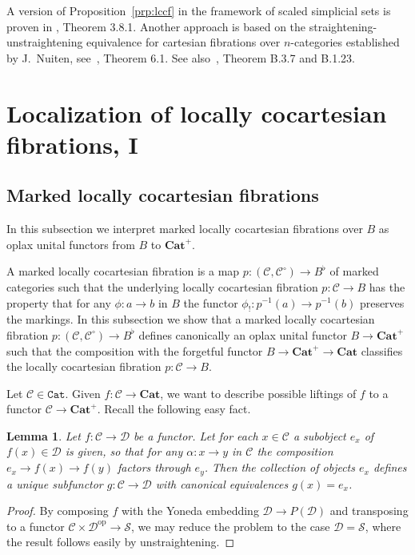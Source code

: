 \documentclass[12pt]{amsart}%
\newtheorem{lem}[subsubsection]{Lemma}
\newcommand{\Cat}{\mathtt{Cat}}
\newcommand{\bfCat}{\mathbf{Cat}}
\newcommand{\op}{\mathrm{op}}
\newcommand{\cC}{\mathcal{C}}
\newcommand{\cD}{\mathcal{D}}
\newcommand{\cS}{\mathcal{S}}
\begin{document}
A version of Proposition~\ref{prp:lccf} in the framework of scaled simplicial sets is proven in \cite{LG}, Theorem 3.8.1. Another approach is
based on the straightening-unstraightening equivalence for
cartesian fibrations over $n$-categories established by J.~Nuiten, see~\cite{N}, Theorem 6.1.
See also~\cite{AMGR}, Theorem B.3.7 and B.1.23.



\section{Localization of locally cocartesian fibrations, I}

\subsection{Marked locally cocartesian fibrations}
In this subsection we interpret marked locally cocartesian fibrations
over $B$ as oplax unital functors from $B$ to $\bfCat^+$.

A marked locally cocartesian fibration is a map $p:(\cC,\cC^\circ)\to B^\flat$
of marked categories such that the underlying locally cocartesian
fibration $p:\cC\to B$ has the property that
for any $\phi:a\to b$ in $B$ the functor $\phi_!:p^{-1}(a)\to p^{-1}(b)$ 
preserves the markings. 
In this subsection we show that a marked locally cocartesian fibration
$p:(\cC,\cC^\circ)\to B^\flat$
defines canonically an oplax unital functor 
$B\to\bfCat^+$ such that the composition with the forgetful functor 
$B\to\bfCat^+\to\bfCat$ classifies the locally cocartesian fibration
$p:\cC\to B$.
 

Let $\cC\in\Cat$.   Given $f:\cC\to\bfCat$, we want to describe possible
liftings of $f$ to a functor $\cC\to\bfCat^+$.
Recall the following easy fact.
\begin{lem} 
\label{lem:sub}
Let $f:\cC\to\cD$ be a functor. Let for each $x\in\cC$
a subobject $e_x$ of $f(x)\in\cD$ is given, so that for any 
$\alpha:x\to y$ in $\cC$ the composition $e_x\to f(x)\to f(y)$
factors through $e_y$. Then the collection of objects $e_x$ defines
a unique subfunctor $g:\cC\to \cD$ with canonical equivalences
$g(x)=e_x$.
\end{lem}
\begin{proof}
By composing $f$ with the Yoneda embedding $\cD\to P(\cD)$
and transposing to a functor $\cC\times\cD^\op\to\cS$, we may reduce the
problem to the case $\cD=\cS$, where the result follows easily by 
unstraightening.
\end{proof}
\end{document}
